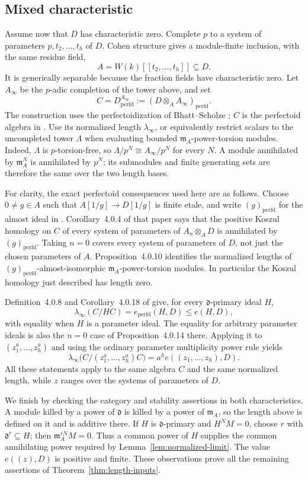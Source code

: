 \subsection{Mixed characteristic}

Assume now that $D$ has characteristic zero.  Complete $p$ to a system
of parameters $p,t_2,\ldots,t_h$ of $D$.  Cohen structure gives a
module-finite inclusion, with the same residue field,
\[
 A=W(k)[[t_2,\ldots,t_h]]\subseteq D.
\]
It is generically separable because the fraction fields have
characteristic zero.  Let $A_\infty$ be the $p$-adic completion of the
tower above, and set
\[
 C=D^{A_\infty}_{\mathrm{perfd}}
   :=(D\otimes_A A_\infty)_{\mathrm{perfd}}.
\]
The construction uses the perfectoidization of Bhatt--Scholze
\cite[Section~8 and Theorem~10.11]{BhattScholze}; $C$ is the
perfectoid algebra in \cite[Notation~4.0.1]{CLMST}.
Use its normalized length
$\lambda_\infty$, or equivalently restrict scalars to the uncompleted
tower $\Lambda$ when evaluating bounded
$\mathfrak m_A$-power-torsion modules.  Indeed, $\Lambda$ is
$p$-torsion-free, so $\Lambda/p^N\cong A_\infty/p^N$ for every $N$.
A module annihilated by $\mathfrak m_A^N$ is annihilated by $p^N$;
its submodules and finite generating sets are therefore the same
over the two length bases.

For clarity, the exact perfectoid consequences used here are as
follows.  Choose $0\neq g\in A$ such that $A[1/g]\to D[1/g]$ is
finite etale, and write $(g)_{\mathrm{perfd}}$ for the almost ideal in
\cite[Notation~4.0.1]{CLMST}.  Corollary~4.0.4 of that paper says that
the positive Koszul homology on $C$ of every system of parameters of
$A_n\otimes_A D$ is annihilated by $(g)_{\mathrm{perfd}}$.
Taking $n=0$ covers every system of parameters of $D$, not just the
chosen parameters of $A$.
Proposition~4.0.10 identifies the normalized lengths of
$(g)_{\mathrm{perfd}}$-almost-isomorphic
$\mathfrak m_A$-power-torsion modules.  In particular the Koszul
homology just described has length zero.

Definition~4.0.8 and Corollary~4.0.18 of \cite{CLMST} give, for every
$\mathfrak d$-primary ideal $H$,
\[
 \lambda_\infty(C/HC)=e_{\mathrm{perfd}}(H,D)\leq e(H,D),
\]
with equality when $H$ is a parameter ideal.  The equality for
arbitrary parameter ideals is also the $n=0$ case of
Proposition~4.0.14 there.  Applying it to
$(z_1^a,\ldots,z_h^a)$ and using the ordinary parameter multiplicity
power rule yields
\[
 \lambda_\infty\bigl(C/(z_1^a,\ldots,z_h^a)C\bigr)
       =a^h e((z_1,\ldots,z_h),D).
\]
All these statements apply to the same algebra $C$ and the same
normalized length, while $z$ ranges over the systems of parameters
of $D$.

We finish by checking the category and stability assertions in both
characteristics.  A module killed by a power of $\mathfrak d$ is killed
by a power of $\mathfrak m_A$, so the length above is defined on it and
is additive there.  If $H$ is $\mathfrak d$-primary and $H^N M=0$,
choose $r$ with $\mathfrak d^r\subseteq H$; then
$\mathfrak m_A^{rN}M=0$.  Thus a common power of $H$ supplies the common
annihilating power required by Lemma~\ref{lem:normalized-limit}.
The value $e((z),D)$ is positive and finite.  These observations prove
all the remaining assertions of Theorem~\ref{thm:length-inputs}.
